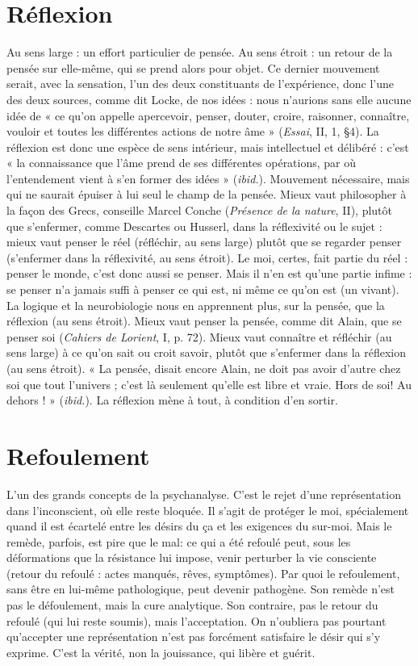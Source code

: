 \section{Réflexion}
Au sens large : un effort particulier de pensée. Au sens étroit :
un retour de la pensée sur elle-même, qui se prend alors pour
objet. Ce dernier mouvement serait, avec la sensation, l’un des deux constituants
de l’expérience, donc l’une des deux sources, comme dit Locke, de nos
idées : nous n’aurions sans elle aucune idée de « ce qu’on appelle apercevoir,
penser, douter, croire, raisonner, connaître, vouloir et toutes les différentes
actions de notre âme » ({\it Essai}, II, 1, \S 4). La réflexion est donc une espèce de
sens intérieur, mais intellectuel et délibéré : c’est « la connaissance que l’âme
prend de ses différentes opérations, par où l’entendement vient à s’en former
des idées » ({\it ibid.}). Mouvement nécessaire, mais qui ne saurait épuiser à lui seul
le champ de la pensée. Mieux vaut philosopher à la façon des Grecs, conseille
Marcel Conche ({\it Présence de la nature}, II), plutôt que s’enfermer, comme Descartes
ou Husserl, dans la réflexivité ou le sujet : mieux vaut penser le réel
(réfléchir, au sens large) plutôt que se regarder penser (s’enfermer dans la
réflexivité, au sens étroit). Le moi, certes, fait partie du réel : penser le monde,
c’est donc aussi se penser. Mais il n’en est qu’une partie infime : se penser n’a
jamais suffi à penser ce qui est, ni même ce qu’on est (un vivant). La logique et
la neurobiologie nous en apprennent plus, sur la pensée, que la réflexion (au
sens étroit). Mieux vaut penser la pensée, comme dit Alain, que se penser soi
({\it Cahiers de Lorient}, I, p. 72). Mieux vaut connaître et réfléchir (au sens large) à
ce qu'on sait ou croit savoir, plutôt que s’enfermer dans la réflexion (au sens
étroit). « La pensée, disait encore Alain, ne doit pas avoir d’autre chez soi que
tout l’univers ; c’est là seulement qu’elle est libre et vraie. Hors de soi! Au
dehors ! » ({\it ibid.}). La réflexion mène à tout, à condition d’en sortir.

\section{Refoulement}
L'un des grands concepts de la psychanalyse. C’est le rejet
d’une représentation dans l’inconscient, où elle reste bloquée.
Il s’agit de protéger le moi, spécialement quand il est écartelé entre les
désirs du ça et les exigences du sur-moi. Mais le remède, parfois, est pire que le
mal: ce qui a été refoulé peut, sous les déformations que la résistance lui
impose, venir perturber la vie consciente (retour du refoulé : actes manqués,
rêves, symptômes). Par quoi le refoulement, sans être en lui-même pathologique,
peut devenir pathogène. Son remède n’est pas le défoulement, mais la
cure analytique. Son contraire, pas le retour du refoulé (qui lui reste soumis),
mais l’acceptation. On n’oubliera pas pourtant qu’accepter une représentation
n’est pas forcément satisfaire le désir qui s’y exprime. C’est la vérité, non la
jouissance, qui libère et guérit.

